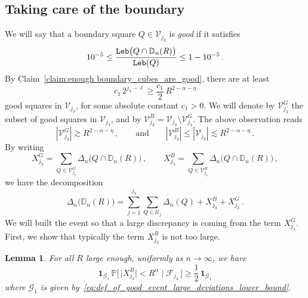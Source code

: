 \documentclass[11pt]{amsart}
\newtheorem{lemma}[theorem]{Lemma}
\theoremstyle{definition}
\theoremstyle{remark}
\numberwithin{equation}{section}
\newcommand{\bD}{\mathbb D}
\newcommand{\bP}{\mathbb P}
\begin{document}
	\subsection{Taking care of the boundary}
	We will say that a boundary square $Q\in \mathcal{V}_{j_3}$ is \emph{good} if it satisfies
	\begin{equation}
		\label{eq:def_of_good_boundary_cube}
		10^{-5} \le \frac{{\tt Leb}\big(Q\cap \bD_n(R)\big)}{{\tt Leb}(Q)} \le 1-10^{-5} \, .
	\end{equation}
	By Claim~\ref{claim:enough boundary_cubes_are_good}, there are at least $$c_1 \, 2^{j_3-\ell} \ge \frac{c_1}{2} \, R^{2-\alpha-\eta}$$ good squares in $\mathcal{V}_{j_3}$, for some absolute constant $c_1>0$. We will denote by $\mathcal{V}_{j_3}^G$ the subset of good squares in $\mathcal{V}_{j_3}$, and by $\mathcal{V}_{j_3}^B = \mathcal{V}_{j_3} \setminus \mathcal{V}_{j_3}^G$. The above observation reads
	\begin{equation}
		\label{eq:lower_and_upper_bounds_on_good_bad_boundary_squares}
		|\mathcal{V}_{j_3}^G| \gtrsim R^{2-\alpha-\eta} \, , \qquad \text{and} \qquad |\mathcal{V}_{j_3}^B|\le |\mathcal{V}_{j_3}| \lesssim R^{2-\alpha-\eta} \, .
	\end{equation}
	By writing
	\[
	X_{j_3}^G = \sum_{Q\in \mathcal{V}_{j_3}^{G}} \Delta_{n}\big(Q\cap \bD_n(R)\big)\, , \qquad X_{j_3}^B = \sum_{Q\in \mathcal{V}_{j_3}^{B}} \Delta_{n}\big(Q\cap \bD_n(R)\big)\, ,
	\]
	we have the decomposition
	\begin{equation}
		\label{eq:large_deviations_lower_bound_decomposition_of_disc}
		\Delta_n\big(\bD_n(R)\big) = \sum_{j=1}^{j_3} \sum_{Q\in \mathcal{U}_j} \Delta_n(Q) + X_{j_3}^B + X_{j_3}^G \, .
	\end{equation}
	We will built the event so that a large discrepancy is coming from the term $X_{j_3}^G$. First, we show that typically the term $X_{j_3}^B$ is not too large.
	\begin{lemma}
		\label{lemma:large_deviations_lower_bound_bad_cubes_do_not_contribute}
		For all $R$ large enough, uniformly as $n\to \infty$, we have
		\[
		\mathbf{1}_{\mathcal{G}_1} \, \bP\Big[ \, \big|X_{j_3}^B\big| < R^{\alpha} \mid \mathcal{F}_{j_3} \, \Big] \ge \frac{1}{2} \, \mathbf{1}_{\mathcal{G}_1} 
		\]
		where $\mathcal{G}_1$ is given by~\eqref{eq:def_of_good_event_large_deviations_lower_bound}.
	\end{lemma} 
\end{document}
